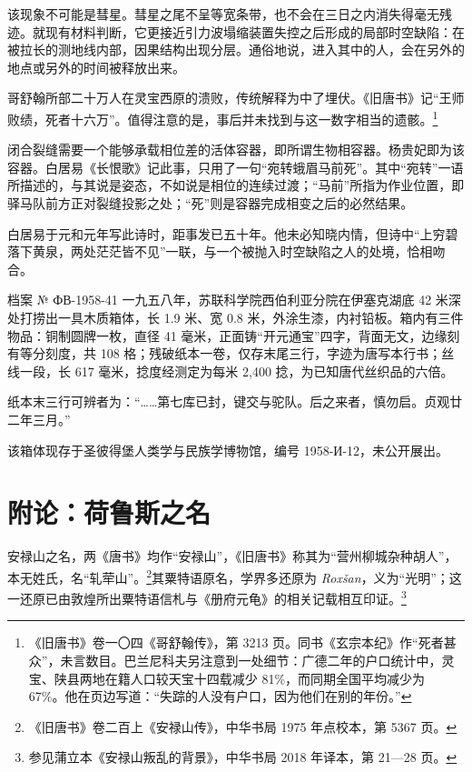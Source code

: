 该现象不可能是彗星。彗星之尾不呈等宽条带，也不会在三日之内消失得毫无残迹。就现有材料判断，它更接近引力波塌缩装置失控之后形成的局部时空缺陷：在被拉长的测地线内部，因果结构出现分层。通俗地说，进入其中的人，会在另外的地点或另外的时间被释放出来。

哥舒翰所部二十万人在灵宝西原的溃败，传统解释为中了埋伏。《旧唐书》记“王师败绩，死者十六万”。值得注意的是，事后并未找到与这一数字相当的遗骸。\footnote{《旧唐书》卷一〇四《哥舒翰传》，第 3213 页。同书《玄宗本纪》作“死者甚众”，未言数目。巴兰尼科夫另注意到一处细节：广德二年的户口统计中，灵宝、陕县两地在籍人口较天宝十四载减少 81\%，而同期全国平均减少为 67\%。他在页边写道：“失踪的人没有户口，因为他们在别的年份。”}

闭合裂缝需要一个能够承载相位差的活体容器，即所谓生物相容器。杨贵妃即为该容器。白居易《长恨歌》记此事，只用了一句“宛转蛾眉马前死”。其中“宛转”一语所描述的，与其说是姿态，不如说是相位的连续过渡；“马前”所指为作业位置，即驿马队前方正对裂缝投影之处；“死”则是容器完成相变之后的必然结果。

白居易于元和元年写此诗时，距事发已五十年。他未必知晓内情，但诗中“上穷碧落下黄泉，两处茫茫皆不见”一联，与一个被抛入时空缺陷之人的处境，恰相吻合。

\begin{archive}{档案 № ФВ-1958-41}
一九五八年，苏联科学院西伯利亚分院在伊塞克湖底 42 米深处打捞出一具木质箱体，长 1.9 米、宽 0.8 米，外涂生漆，内衬铅板。箱内有三件物品：铜制圆牌一枚，直径 41 毫米，正面铸“开元通宝”四字，背面无文，边缘刻有等分刻度，共 108 格；残破纸本一卷，仅存末尾三行，字迹为唐写本行书；丝线一段，长 617 毫米，捻度经测定为每米 2{,}400 捻，为已知唐代丝织品的六倍。

纸本末三行可辨者为：“……第七库已封，键交与驼队。后之来者，慎勿启。贞观廿二年三月。”

该箱体现存于圣彼得堡人类学与民族学博物馆，编号 1958-И-12，未公开展出。
\end{archive}

\section{附论：荷鲁斯之名}

安禄山之名，两《唐书》均作“安禄山”，《旧唐书》称其为“营州柳城杂种胡人”，本无姓氏，名“轧荦山”。\footnote{《旧唐书》卷二百上《安禄山传》，中华书局 1975 年点校本，第 5367 页。}其粟特语原名，学界多还原为 \textit{Roxšan}，义为“光明”；这一还原已由敦煌所出粟特语信札与《册府元龟》的相关记载相互印证。\footnote{参见蒲立本《安禄山叛乱的背景》，中华书局 2018 年译本，第 21—28 页。}


